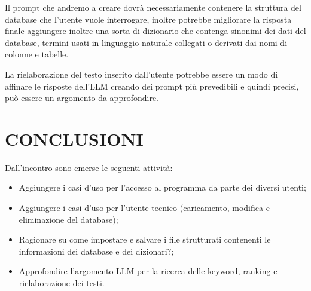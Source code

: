 \documentclass[5pt]{article}
\begin{document}
Il prompt che andremo a creare dovrà necessariamente contenere la struttura del database che l'utente vuole interrogare, inoltre potrebbe migliorare la risposta finale aggiungere inoltre una sorta di dizionario che contenga sinonimi dei dati del database, termini usati in linguaggio naturale collegati o derivati dai nomi di colonne e tabelle. %

La rielaborazione del testo inserito dall'utente potrebbe essere un modo di affinare le risposte dell'LLM creando dei prompt più prevedibili e quindi precisi, può essere un argomento da approfondire.

\section{CONCLUSIONI}
Dall'incontro sono emerse le seguenti attività: 
\begin{itemize}
    \item Aggiungere i casi d'uso per l'accesso al programma da parte dei diversi utenti;
    \item Aggiungere i casi d'uso per l'utente tecnico (caricamento, modifica e eliminazione del database);
    \item Ragionare su come impostare e salvare i file strutturati contenenti le informazioni dei database e dei dizionari?;
    \item Approfondire l'argomento LLM per la ricerca delle keyword, ranking e rielaborazione dei testi. %
\end{itemize}
\end{document}
